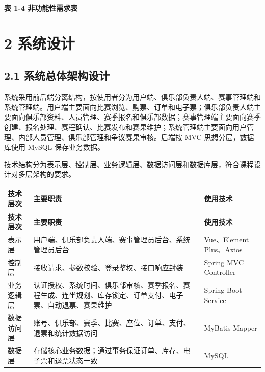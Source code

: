 \documentclass[UTF8,zihao=-4,a4paper]{ctexart}
\newcommand{\tablecaptionline}[1]{\vspace{-1.6em}\begin{center}\small\bfseries #1\end{center}\vspace{0.2em}}
\begin{document}
\tablecaptionline{表 1-4 非功能性需求表}

\section*{2 系统设计}
{}

\subsection*{2.1 系统总体架构设计}
{}

系统采用前后端分离结构，按使用者分为用户端、俱乐部负责人端、赛事管理端和系统管理端。用户端主要面向比赛浏览、购票、订单和电子票；俱乐部负责人端主要面向俱乐部资料、人员管理、赛季报名和俱乐部数据；赛事管理端主要面向赛季创建、报名处理、赛程确认、比赛发布和赛果维护；系统管理端主要面向用户管理、内部人员管理、俱乐部管理和争议赛果审核。后端按 MVC 思想分层，数据库使用 MySQL 保存业务数据。

技术结构分为表示层、控制层、业务逻辑层、数据访问层和数据库层，符合课程设计对多层架构的要求。


\begin{center}
\small
\begin{longtable}{>{\raggedright\arraybackslash}p{} >{\raggedright\arraybackslash}p{} >{\raggedright\arraybackslash}p{}}
\toprule
\rowcolor{tablehead}
\textbf{技术层次} & \textbf{主要职责} & \textbf{使用技术} \\
\midrule
\endfirsthead
\toprule
\rowcolor{tablehead}
\textbf{技术层次} & \textbf{主要职责} & \textbf{使用技术} \\
\midrule
\endhead
表示层 & 用户端、俱乐部负责人端、赛事管理员后台、系统管理员后台 & Vue、Element Plus、Axios \\
\midrule
控制层 & 接收请求、参数校验、登录鉴权、接口响应封装 & Spring MVC Controller \\
\midrule
业务逻辑层 & 认证授权、系统时间、俱乐部审核、赛季报名、赛程生成、连坐规划、库存锁定、订单支付、电子票、自动退票、赛果维护 & Spring Boot Service \\
\midrule
数据访问层 & 账号、俱乐部、赛季、比赛、座位、订单、支付、退票和统计数据访问 & MyBatis Mapper \\
\midrule
数据层 & 存储核心业务数据；通过事务保证订单、库存、电子票和退票状态一致 & MySQL \\
\midrule
\bottomrule
\end{longtable}
\end{center}
\end{document}

